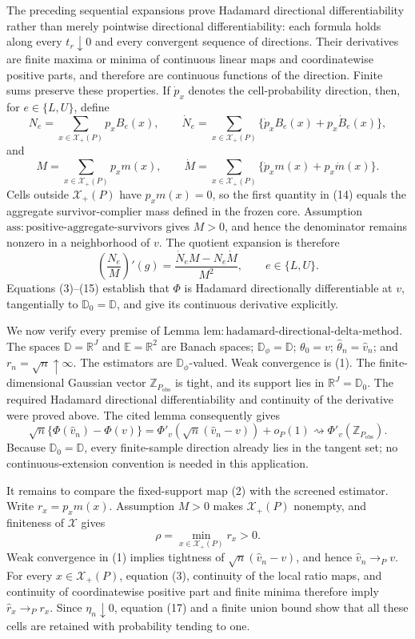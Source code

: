 The preceding sequential expansions prove Hadamard directional differentiability rather than merely pointwise directional differentiability: each formula holds along every \(t_r\downarrow0\) and every convergent sequence of directions.  Their derivatives are finite maxima or minima of continuous linear maps and coordinatewise positive parts, and therefore are continuous functions of the direction.  Finite sums preserve these properties.  If \(\dot p_x\) denotes the cell-probability direction, then, for \(e\in\{L,U\}\), define
\[
N_e=\sum_{x\in\mathcal X_+(P)}p_xB_e(x),
\qquad
\dot N_e=\sum_{x\in\mathcal X_+(P)}
\{\dot p_xB_e(x)+p_x\dot B_e(x)\},
\tag{13}
\]
and
\[
M=\sum_{x\in\mathcal X_+(P)}p_xm(x),
\qquad
\dot M=\sum_{x\in\mathcal X_+(P)}
\{\dot p_xm(x)+p_x\dot m(x)\}.
\tag{14}
\]
Cells outside \(\mathcal X_+(P)\) have \(p_xm(x)=0\), so the first quantity in (14) equals the aggregate survivor-complier mass defined in the frozen core.  Assumption \(\mathrm{ass{:}positive\text{-}aggregate\text{-}survivors}\) gives \(M>0\), and hence the denominator remains nonzero in a neighborhood of \(v\).  The quotient expansion is therefore
\[
\left(\frac{N_e}{M}\right)'(g)
=\frac{\dot N_eM-N_e\dot M}{M^2},
\qquad e\in\{L,U\}.
\tag{15}
\]
Equations (3)--(15) establish that \(\Phi\) is Hadamard directionally differentiable at \(v\), tangentially to \(\mathbb D_0=\mathbb D\), and give its continuous derivative explicitly.

We now verify every premise of Lemma \(\mathrm{lem{:}hadamard\text{-}directional\text{-}delta\text{-}method}\).  The spaces \(\mathbb D=\mathbb R^J\) and \(\mathbb E=\mathbb R^2\) are Banach spaces; \(\mathbb D_\phi=\mathbb D\); \(\theta_0=v\); \(\widehat\theta_n=\widehat v_n\); and \(r_n=\sqrt n\uparrow\infty\).  The estimators are \(\mathbb D_\phi\)-valued.  Weak convergence is (1).  The finite-dimensional Gaussian vector \(\mathbb Z_{P_{\mathrm{obs}}}\) is tight, and its support lies in \(\mathbb R^J=\mathbb D_0\).  The required Hadamard directional differentiability and continuity of the derivative were proved above.  The cited lemma consequently gives
\[
\sqrt n\{\Phi(\widehat v_n)-\Phi(v)\}
=\Phi'_v\!\left(\sqrt n(\widehat v_n-v)\right)+o_P(1)
\rightsquigarrow\Phi'_v(\mathbb Z_{P_{\mathrm{obs}}}).
\tag{16}
\]
Because \(\mathbb D_0=\mathbb D\), every finite-sample direction already lies in the tangent set; no continuous-extension convention is needed in this application.

It remains to compare the fixed-support map (2) with the screened estimator.  Write \(r_x=p_xm(x)\).  Assumption \(M>0\) makes \(\mathcal X_+(P)\) nonempty, and finiteness of \(\mathcal X\) gives
\[
\rho=\min_{x\in\mathcal X_+(P)}r_x>0.
\tag{17}
\]
Weak convergence in (1) implies tightness of \(\sqrt n(\widehat v_n-v)\), and hence \(\widehat v_n\to_Pv\).  For every \(x\in\mathcal X_+(P)\), equation (3), continuity of the local ratio maps, and continuity of coordinatewise positive part and finite minima therefore imply \(\widehat r_x\to_Pr_x\).  Since \(\eta_n\downarrow0\), equation (17) and a finite union bound show that all these cells are retained with probability tending to one.

